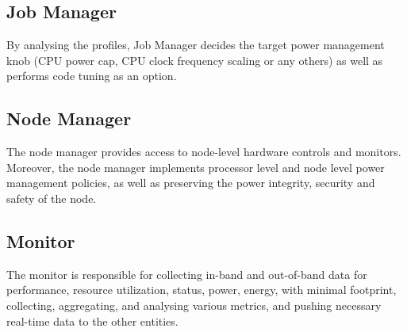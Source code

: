 \subsection{Job Manager}
By analysing the profiles, Job Manager decides the target power management knob (CPU power cap, CPU clock frequency scaling or any others) as well as performs code tuning as an option. 

\subsection{Node Manager}
The node manager provides access to node-level hardware controls and monitors. Moreover, the node manager implements processor level and node level power management policies, as well as preserving the power integrity, security and safety of the node. 

\subsection{Monitor}
The monitor is responsible for collecting in-band and out-of-band data for performance, resource utilization, status, power, energy, with minimal footprint, collecting, aggregating, and analysing various metrics, and pushing necessary real-time data to the other entities.
